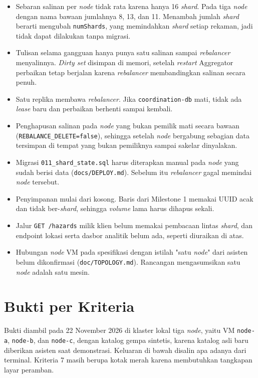 \begin{itemize}
\item Sebaran salinan per \textit{node} tidak rata karena hanya 16 \textit{shard}. Pada tiga \textit{node} dengan nama bawaan jumlahnya 8, 13, dan 11. Menambah jumlah \textit{shard} berarti mengubah \texttt{numShards}, yang memindahkan \textit{shard} setiap rekaman, jadi tidak dapat dilakukan tanpa migrasi.
\item Tulisan selama gangguan hanya punya satu salinan sampai \textit{rebalancer} menyalinnya. \textit{Dirty set} disimpan di memori, setelah \textit{restart} Aggregator perbaikan tetap berjalan karena \textit{rebalancer} membandingkan salinan secara penuh.
\item Satu replika membawa \textit{rebalancer}. Jika \texttt{coordination-db} mati, tidak ada \textit{lease} baru dan perbaikan berhenti sampai kembali.
\item Penghapusan salinan pada \textit{node} yang bukan pemilik mati secara bawaan (\texttt{REBALANCE\_DELETE=false}), sehingga setelah \textit{node} bergabung sebagian data tersimpan di tempat yang bukan pemiliknya sampai sakelar dinyalakan.
\item Migrasi \texttt{011\_shard\_state.sql} harus diterapkan manual pada \textit{node} yang sudah berisi data (\texttt{docs/DEPLOY.md}). Sebelum itu \textit{rebalancer} gagal memindai \textit{node} tersebut.
\item Penyimpanan mulai dari kosong. Baris dari Milestone 1 memakai UUID acak dan tidak ber-\textit{shard}, sehingga \textit{volume} lama harus dihapus sekali.
\item Jalur \texttt{GET /hazards} milik klien belum memakai pembacaan lintas \textit{shard}, dan endpoint lokasi serta dasbor analitik belum ada, seperti diuraikan di atas.
\item Hubungan \textit{node} VM pada spesifikasi dengan istilah "satu \textit{node}" dari asisten belum dikonfirmasi (\texttt{doc/TOPOLOGY.md}). Rancangan mengasumsikan satu \textit{node} adalah satu mesin.
\end{itemize}

\section{Bukti per Kriteria}

Bukti diambil pada 22 November 2026 di klaster lokal tiga \textit{node}, yaitu VM \texttt{node-a}, \texttt{node-b}, dan \texttt{node-c}, dengan katalog gempa sintetis, karena katalog asli baru diberikan asisten saat demonstrasi. Keluaran di bawah disalin apa adanya dari terminal. Kriteria 7 masih berupa kotak merah karena membutuhkan tangkapan layar peramban.

